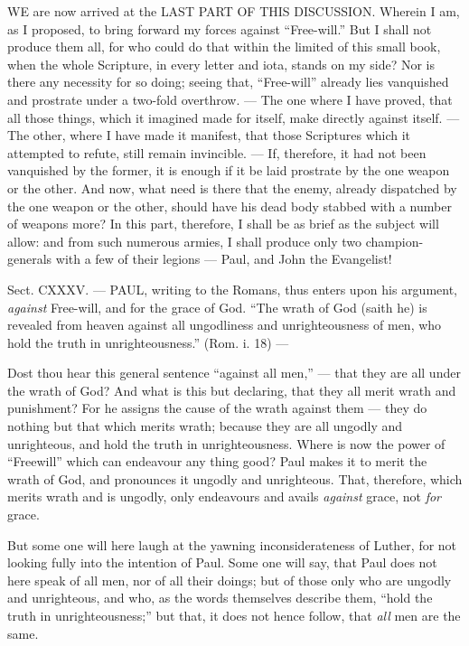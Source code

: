 WE are now arrived at the \textsc{LAST PART OF THIS DISCUSSION}. Wherein I am, as I proposed, to bring forward my forces against “Free-will.” But I shall not produce them all, for who could do that within the limited of this small book, when the whole Scripture, in every letter and iota, stands on my side? Nor is there any necessity for so doing; seeing that, “Free-will” already lies vanquished and prostrate under a two-fold overthrow. — The one where I have proved, that all those things, which it imagined made for itself, make directly against itself. — The other, where I have made it manifest, that those Scriptures which it attempted to refute, still remain invincible. — If, therefore, it had not been vanquished by the former, it is enough if it be laid prostrate by the one weapon or the other. And now, what need is there that the enemy, already dispatched by the one weapon or the other, should have his dead body stabbed with a number of weapons more? In this part, therefore, I shall be as brief as the subject will allow: and from such numerous armies, I shall produce only two champion-generals with a few of their legions — Paul, and John the Evangelist!


Sect. CXXXV. — PAUL, writing to the Romans, thus enters upon his argument, \emph{against }Free-will, and for the grace of God. “The wrath of God (saith he) is revealed from heaven against all ungodliness and unrighteousness of men, who hold the truth in unrighteousness.” (Rom. i. 18) —

Dost thou hear this general sentence “against all men,” — that they are all under the wrath of God? And what is this but declaring, that they all merit wrath and punishment? For he assigns the cause of the wrath against them — they do nothing but that which merits wrath; because they are all ungodly and unrighteous, and hold the truth in unrighteousness. Where is now the power of “Freewill” which can endeavour any thing good? Paul makes it to merit the wrath of God, and pronounces it ungodly and unrighteous. That, therefore, which merits wrath and is ungodly, only endeavours and avails \emph{against }grace, not \emph{for }grace.

But some one will here laugh at the yawning inconsiderateness of Luther, for not looking fully into the intention of Paul. Some one will say, that Paul does not here speak of all men, nor of all their doings; but of those only who are ungodly and unrighteous, and who, as the words themselves describe them, “hold the truth in unrighteousness;” but that, it does not hence follow, that \emph{all }men are the same.


